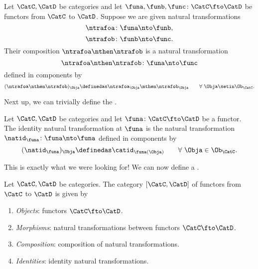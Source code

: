 \begin{ctdefinition}\label{def:composition-of-naturali-tranformations}
    Let $\CatC, \CatD$ be categories and let $\funa, \funb, \func \colon \CatC \fto \CatD$ be functors from $\CatC$ to $\CatD$.
    Suppose we are given natural transformations
    \begin{equation}
        \ntrafoa \colon \funa \nto \funb,
    \end{equation}
    \begin{equation}
        \ntrafob \colon \funb \nto \func.
    \end{equation}
    Their composition $\ntrafoa \nthen \ntrafob$ is a natural transformation
    \begin{equation}
        \ntrafoa \nthen \ntrafob \colon \funa \nto \func
    \end{equation}
    defined in components by
    \begin{equation}\label{eq:nat-trafo-composition}
        (\ntrafoa \nthen \ntrafob)_\Obja \definedas \ntrafoa_\Obja \mthen \ntrafob_\Obja \quad \quad \forall \ \Obja \setin \Ob_\CatC.
    \end{equation}
\end{ctdefinition}
Next up, we can trivially define the .

\begin{ctdefinition}\label{def:identity-natural-transformation}
    Let $\CatC, \CatD$ be categories and let $\funa \colon \CatC \fto \CatD$ be a functor.
    The identity natural transformation at $\funa$ is the natural transformation $\natid_\funa \colon \funa \nto \funa$ defined in components by
    \begin{equation}\label{eq:identity-nat-trafo-def}
        (\natid_\funa)_\Obja \definedas \catid_{\funa(\Obja)} \quad \quad \forall \ \Obja \in \Ob_\CatC.
    \end{equation}
\end{ctdefinition}

This is exactly what we were looking for! We can now define a . 

\begin{ctdefinition}\label{def:category-of-functors}
    Let $\CatC, \CatD$ be categories.
    The category $[\CatC, \CatD]$ of functors from $\CatC$ to $\CatD$ is given by
    \begin{enumerate}
        \item \emph{Objects}: functors $\CatC \fto \CatD$.
        \item \emph{Morphisms}: natural transformations between functors $\CatC \fto \CatD$.
        \item \emph{Composition}: composition of natural transformations.
        \item \emph{Identities}: identity natural transformations.
    \end{enumerate}
\end{ctdefinition}




